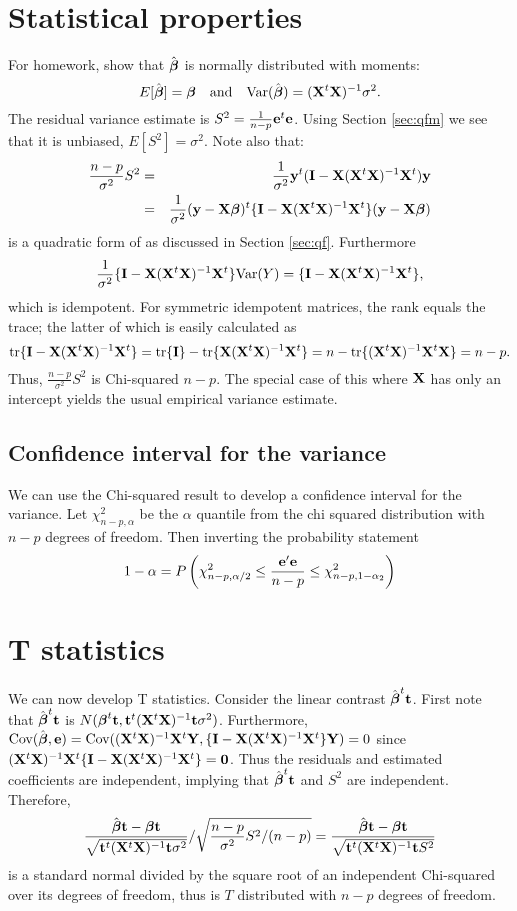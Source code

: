 \section{Statistical properties}
For homework, show that $\hat {\boldsymbol{\beta}}$ is normally distributed with moments: 
$$
E[\hat {\boldsymbol{\beta}}] = \boldsymbol{\beta} ~~~\mbox{and}~~~ \mbox{Var}(\hat {\boldsymbol{\beta}}) = (\mathbf{X}^t \mathbf{X})^{-1} \sigma^2.
$$
The residual variance estimate is $S^2 = \frac{1}{n-p}\mathbf{e}^t \mathbf{e}$. Using Section
\ref{sec:qfm} we see that it is unbiased, $E[S^2] = \sigma^2$.  
Note also that:
\begin{eqnarray*}
\frac{n-p}{\sigma^2} S^2 & = & \frac{1}{\sigma^2}\mathbf{y}^t (\mathbf{I} - \mathbf{X} (\mathbf{X}^t \mathbf{X})^{-1} \mathbf{X}^t) \mathbf{y} \\
& = & \frac{1}{\sigma^2}(\mathbf{y} - \mathbf{X} \boldsymbol{\beta})^t \{\mathbf{I} - \mathbf{X} (\mathbf{X}^t \mathbf{X})^{-1} \mathbf{X}^t\} (\mathbf{y} - \mathbf{X} \boldsymbol{\beta})
\end{eqnarray*}
is a quadratic form of as discussed in Section \eqref{sec:qf}.  
Furthermore
$$
\frac{1}{\sigma^2}\{\mathbf{I} - \mathbf{X} (\mathbf{X}^t \mathbf{X})^{-1} \mathbf{X}^t\} \mbox{Var}(Y) = \{\mathbf{I} - \mathbf{X} (\mathbf{X}^t \mathbf{X})^{-1} \mathbf{X}^t\},
$$
which is idempotent. For symmetric idempotent matrices, the rank equals
the trace; the latter of which is easily calculated as
$$
\mbox{tr}\{\mathbf{I} - \mathbf{X} (\mathbf{X}^t \mathbf{X})^{-1} \mathbf{X}^t\} = \mbox{tr}\{\mathbf{I}\} - \mbox{tr}\{\mathbf{X} (\mathbf{X}^t \mathbf{X})^{-1} \mathbf{X}^t\}
= n - \mbox{tr}\{(\mathbf{X}^t \mathbf{X})^{-1} \mathbf{X}^t \mathbf{X}\} = n - p.
$$
Thus, $\frac{n-p}{\sigma^2} S^2$ is Chi-squared $n-p$. The special
case of this where $\mathbf{X}$ has only an intercept yields the usual
empirical variance estimate.


\subsection{Confidence interval for the variance}
We can use the Chi-squared result to develop a confidence interval
for the variance. Let $\chi^2_{n-p, \alpha}$ be the $\alpha$ quantile
from the chi squared distribution with $n-p$ degrees of freedom.
Then inverting the probability statement
$$
1 - \alpha = 
P\left(
\chi^2_{n-p, \alpha/2}
\leq \frac{\mathbf{e}' \mathbf{e}}{n-p}
\leq 
\chi^2_{n-p,1 - \alpha_2}
\right)
$$


\section{T statistics}
We can now develop T statistics.
Consider the linear contrast $\hat {\boldsymbol{\beta}}^t \mathbf{t}$. First note that
$\hat {\boldsymbol{\beta}}^t \mathbf{t}$ is $N(\boldsymbol{\beta}^t \mathbf{t}, \mathbf{t}^t (\mathbf{X}^t \mathbf{X})^{-1} \mathbf{t} \sigma^2)$. 
Furthermore,
$\mbox{Cov}(\hat {\boldsymbol{\beta}}, \mathbf{e}) = \mbox{Cov}((\mathbf{X}^t \mathbf{X})^{-1} \mathbf{X}^t \mathbf{Y}, \{\mathbf{I} - \mathbf{X} (\mathbf{X}^t \mathbf{X})^{-1} \mathbf{X}^t\} \mathbf{Y}) = 0$
since $(\mathbf{X}^t \mathbf{X})^{-1} \mathbf{X}^t \{\mathbf{I} - \mathbf{X} (\mathbf{X}^t \mathbf{X})^{-1} \mathbf{X}^t\} = \mathbf{0}$. Thus the residuals
and estimated coefficients are independent, implying that $\hat {\boldsymbol{\beta}}^t \mathbf{t}$
and $S^2$ are independent.
Therefore,
$$
\frac{\hat {\boldsymbol{\beta}} \mathbf{t} - \boldsymbol{\beta} \mathbf{t}}{\sqrt{\mathbf{t}^t (\mathbf{X}^t \mathbf{X})^{-1} \mathbf{t} \sigma^2}}
/ \sqrt{\frac{n-p}{\sigma^2} S^2 / (n-p)}
=\frac{\hat {\boldsymbol{\beta}} \mathbf{t} - \boldsymbol{\beta} \mathbf{t}}{\sqrt{\mathbf{t}^t (\mathbf{X}^t \mathbf{X})^{-1} \mathbf{t} S^2}}
$$
is a standard normal divided by the square root of an independent Chi-squared
over its degrees of freedom, thus is $T$ distributed with $n-p$ degrees of freedom.

